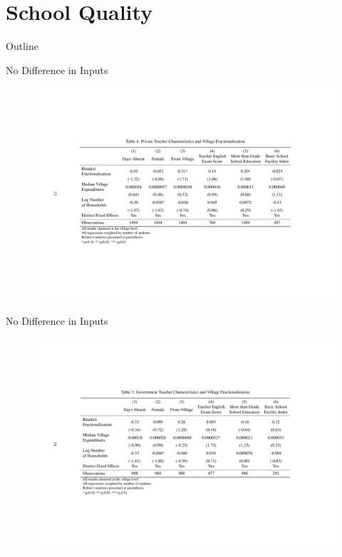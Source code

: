 \documentclass{beamer}
\begin{document}
\section{School Quality}\label{}
\begin{frame}{Outline}
	\tableofcontents[currentsection]
\end{frame}

\begin{frame}{No Difference in Inputs}
	\begin{figure}[htb]
		\begin{center}
		\includegraphics[scale=0.5]{tables/Private_teacher_quality.pdf}
		\end{center}
	\end{figure}
\end{frame}

\begin{frame}{No Difference in Inputs}
	\begin{figure}[htb]
		\begin{center}
		\includegraphics[scale=0.5]{tables/govt_teacher_quality.pdf}
		\end{center}
	\end{figure}
	
\end{frame}
\end{document}
